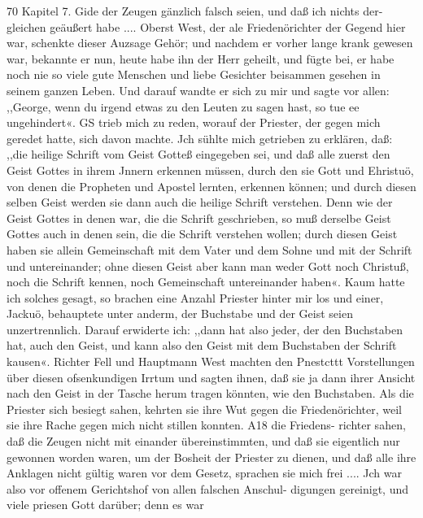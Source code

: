 
70 Kapitel 7.
Gide der Zeugen gänzlich falsch seien, und daß ich nichts der-
gleichen geäußert habe .... Oberst West, der ale Friedenörichter
der Gegend hier war, schenkte dieser Auzsage Gehör; und
nachdem er vorher lange krank gewesen war, bekannte er nun,
heute habe ihn der Herr geheilt, und fügte bei, er habe noch nie
so viele gute Menschen und liebe Gesichter beisammen gesehen in
seinem ganzen Leben. Und darauf wandte er sich zu mir und
sagte vor allen: ,,George, wenn du irgend etwas zu den Leuten
zu sagen hast, so tue ee ungehindert«. GS trieb mich zu reden,
worauf der Priester, der gegen mich geredet hatte, sich davon
machte. Jch sühlte mich getrieben zu erklären, daß: ,,die heilige
Schrift vom Geist Gotteß eingegeben sei, und daß alle zuerst
den Geist Gottes in ihrem Jnnern erkennen müssen, durch den
sie Gott und Ehristuö, von denen die Propheten und Apostel
lernten, erkennen können; und durch diesen selben Geist werden
sie dann auch die heilige Schrift verstehen. Denn wie der Geist
Gottes in denen war, die die Schrift geschrieben, so muß derselbe
Geist Gottes auch in denen sein, die die Schrift verstehen wollen;
durch diesen Geist haben sie allein Gemeinschaft mit dem Vater
und dem Sohne und mit der Schrift und untereinander; ohne
diesen Geist aber kann man weder Gott noch Christuß, noch die
Schrift kennen, noch Gemeinschaft untereinander haben«. Kaum
hatte ich solches gesagt, so brachen eine Anzahl Priester hinter
mir los und einer, Jackuö, behauptete unter anderm, der
Buchstabe und der Geist seien unzertrennlich. Darauf erwiderte
ich: ,,dann hat also jeder, der den Buchstaben hat, auch den
Geist, und kann also den Geist mit dem Buchstaben der Schrift
kausen«. Richter Fell und Hauptmann West machten den Pnestcttt
Vorstellungen über diesen ofsenkundigen Irrtum und sagten ihnen,
daß sie ja dann ihrer Ansicht nach den Geist in der Tasche herum
tragen könnten, wie den Buchstaben. Als die Priester sich besiegt
sahen, kehrten sie ihre Wut gegen die Friedenörichter, weil sie
ihre Rache gegen mich nicht stillen konnten. A18 die Friedens-
richter sahen, daß die Zeugen nicht mit einander übereinstimmten,
und daß sie eigentlich nur gewonnen worden waren, um der
Bosheit der Priester zu dienen, und daß alle ihre Anklagen nicht
gültig waren vor dem Gesetz, sprachen sie mich frei .... Jch
war also vor offenem Gerichtshof von allen falschen Anschul-
digungen gereinigt, und viele priesen Gott darüber; denn es war


